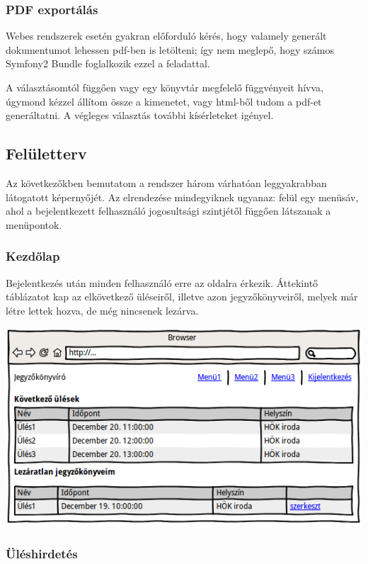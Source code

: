 \documentclass[a4paper,12pt,oneside]{report}
\begin{document}
\subsubsection{PDF exportálás}

Webes rendszerek esetén gyakran előforduló kérés, hogy valamely generált dokumentumot lehessen pdf-ben is letölteni; így nem meglepő, hogy számos Symfony2 Bundle foglalkozik ezzel a feladattal.

A választásomtól függően vagy egy könyvtár megfelelő függvényeit hívva, úgymond kézzel állítom össze a kimenetet, vagy html-ből tudom a pdf-et generáltatni. A végleges választás további kísérleteket igényel.

\subsection{Felületterv}

Az következőkben bemutatom a rendszer három várhatóan leggyakrabban látogatott képernyőjét. Az elrendezése mindegyiknek ugyanaz: felül egy menüsáv, ahol a bejelentkezett felhasználó jogosultsági szintjétől függően látszanak a menüpontok.

\subsubsection{Kezdőlap}

Bejelentkezés után minden felhasználó erre az oldalra érkezik. Áttekintő táblázatot kap az elkövetkező üléseiről, illetve azon jegyzőkönyveiről, melyek már létre lettek hozva, de még nincsenek lezárva.

\includegraphics[width=\textwidth]{wireframe-kezdolap}

\subsubsection{Üléshirdetés}
\end{document}
